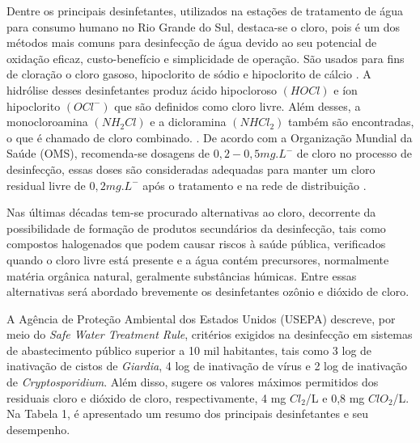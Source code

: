 Dentre os principais desinfetantes, utilizados na estações de tratamento de água para consumo humano no Rio Grande do Sul, destaca-se o cloro, pois é um dos métodos mais comuns para desinfecção de água devido ao seu potencial de oxidação eficaz, custo-benefício e simplicidade de operação. São usados para fins de cloração o cloro gasoso, hipoclorito de sódio e hipoclorito de cálcio \cite{Meyer}. A hidrólise desses desinfetantes produz ácido hipocloroso \begin{math}(HOCl)\end{math} e íon hipoclorito \begin{math} (OCl^- )\end{math} que são definidos como cloro livre.  Além desses, a monocloroamina \begin{math}(NH_2Cl)\end{math} e a dicloramina  \begin{math}(NHCl_2)\end{math} também são encontradas, o que é chamado de cloro combinado. \cite{brasila}. De acordo com a Organização Mundial da Saúde (OMS), recomenda-se dosagens de \begin{math}0,2 - 0,5 mg.L^-\end{math} de cloro no processo de desinfecção, essas doses são consideradas adequadas para manter um cloro residual livre de \begin{math}0,2 mg.L^-\end{math} após o tratamento e na rede de distribuição \cite{who17}. 

Nas últimas décadas tem-se procurado alternativas ao cloro, decorrente da possibilidade de formação de produtos secundários da desinfecção, tais como compostos halogenados que podem causar riscos à saúde pública, verificados quando o cloro livre está presente e a água contém precursores, normalmente matéria orgânica natural, geralmente substâncias húmicas. Entre essas alternativas será abordado brevemente os desinfetantes ozônio e dióxido de cloro. 

A Agência de Proteção Ambiental dos Estados Unidos (USEPA) descreve, por meio do \textit{Safe Water Treatment Rule}, critérios exigidos na desinfecção em sistemas de abastecimento público superior a 10 mil habitantes, tais como 3 log de inativação de cistos de \textit{Giardia}, 4 log de inativação de vírus e 2 log de inativação de \textit{Cryptosporidium}. Além disso, sugere os valores máximos permitidos dos residuais cloro e dióxido de cloro, respectivamente, 4 mg $Cl_2$/L e 0,8 mg $ClO_2$/L. Na Tabela 1, é apresentado um resumo dos principais desinfetantes e seu desempenho.

